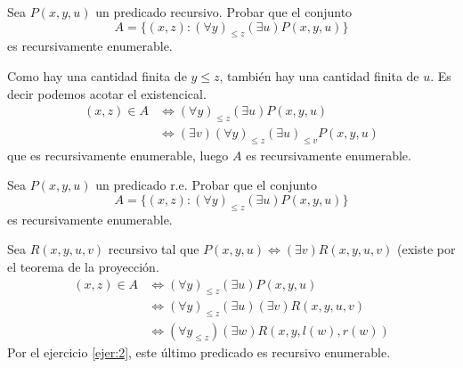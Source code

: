 \documentclass[twoside]{article}
\newcommand{\sii}{{\Leftrightarrow}}
\begin{document}
\begin{ejercicio}{2}
Sea $P(x,y,u)$ un predicado recursivo. Probar que el conjunto
\[ A = \{(x,z) : (\forall y)_{≤z} (\exists u) P(x,y,u)\} \]
es recursivamente enumerable.
\end{ejercicio}
\begin{solucion}
Como hay una cantidad finita de $y≤z$, también hay una cantidad finita de $u$. Es decir podemos acotar el existencical.
\begin{align*}
	(x,z) \in A & \sii (\forall y)_{≤z} (\exists u) P(x,y,u)\\
	& \sii (\exists v)(\forall y)_{≤z} (\exists u)_{≤v} P(x,y,u)
\end{align*}
 que es recursivamente enumerable, luego $A$ es recursivamente enumerable.
\end{solucion}

\newpage

\begin{ejercicio}{3}
Sea $P(x,y,u)$ un predicado r.e. Probar que el conjunto
\[ A = \{(x,z) : (\forall y)_{≤z} (\exists u) P(x,y,u)\} \]
es recursivamente enumerable.
\end{ejercicio}
\begin{solucion}
Sea $R(x,y,u,v)$ recursivo tal que $P(x,y,u) \sii (\exists v) R(x,y,u,v)$ (existe por el teorema de la proyección.
\begin{align*}
	(x,z) \in A & \sii (\forall y)_{≤z} (\exists u) P(x,y,u)\\
	& \sii (\forall y)_{≤z} (\exists u) (\exists v) R(x,y,u,v)\\
	& \sii (\forall y_{≤z}) (\exists w) R(x,y,l(w),r(w))
\end{align*}
Por el ejercicio \ref{ejer:2}, este último predicado es recursivo enumerable. 
\end{solucion}

\newpage
\end{document}
